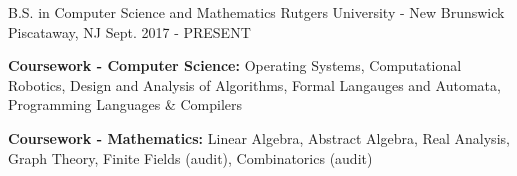 


\begin{cventries}


  \cventry
  {B.S. in Computer Science and Mathematics} %
  {Rutgers University - New Brunswick} %
  {Piscataway, NJ} %
  {Sept. 2017 - PRESENT} %
  { %
    \begin{cvitems}
    \item {\textbf{Coursework - Computer Science:} Operating Systems, Computational Robotics, Design and Analysis of Algorithms, Formal Langauges and Automata, Programming Languages \& Compilers}
    \item {\textbf{Coursework - Mathematics:} Linear Algebra, Abstract Algebra, Real Analysis, Graph Theory, Finite Fields (audit), Combinatorics (audit)}
    \end{cvitems}
  }


\end{cventries}
